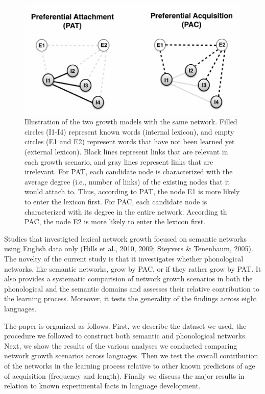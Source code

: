 \documentclass[10pt, letterpaper]{article}
\newenvironment{CodeChunk}{}{}
\begin{document}
\begin{CodeChunk}
\begin{figure}[H]

{\centering \includegraphics{figs/growth-1} 

}

\caption{\label{fig:growth}Illustration of the two growth models with the same network. Filled circles (I1-I4) represent known words (internal lexicon), and empty circles (E1 and E2) represent words that have not been learned yet (external lexicon). Black lines represent links that are relevant in each growth scenario, and gray lines represent links that are irrelevant. For PAT, each candidate node is characterized with the average degree (i.e., number of links) of the existing nodes that it would attach to. Thus, according to PAT, the node E1 is more likely to enter the lexicon first. For PAC, each candidate node is characterized with its degree in the entire network. According th PAC, the node E2 is more likely to enter the lexicon first.}\label{fig:growth}
\end{figure}
\end{CodeChunk}

Studies that investigted lexical network growth focused on semantic
networks using English data only (Hills et al., 2010, 2009; Steyvers \&
Tenenbaum, 2005). The novelty of the current study is that it
investigates whether phonological networks, like semantic networks, grow
by PAC, or if they rather grow by PAT. It also provides a systematic
comparision of network growth scenarios in both the phonological and the
semantic domains and assesses their relative contribution to the
learning process. Moreover, it tests the generality of the findings
across eight languages.

The paper is organized as follows. First, we describe the dataset we
used, the procedure we followed to construct both semantic and
phonological networks. Next, we show the results of the various analyses
we conducted comparing network growth scenarios across languages. Then
we test the overall contribution of the networks in the learning process
relative to other known predictors of age of acquisition (frequency and
length). Finally we discuss the major results in relation to known
experimental facts in language development.
\end{document}
